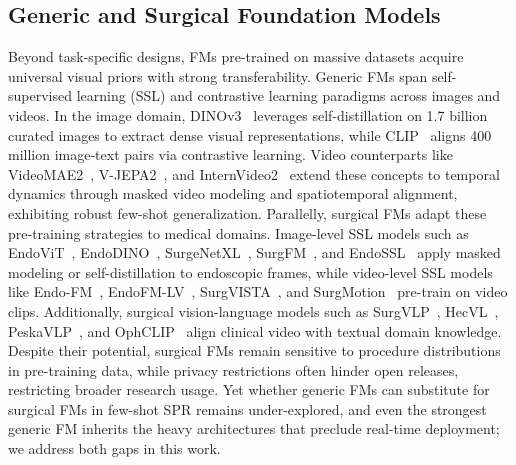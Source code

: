 \subsection{Generic and Surgical Foundation Models}
Beyond task-specific designs, FMs pre-trained on massive datasets acquire universal visual priors with strong transferability. Generic FMs span self-supervised learning (SSL) and contrastive learning paradigms across images and videos. In the image domain, DINOv3~\cite{simeoni2025dinov3} leverages self-distillation on 1.7 billion curated images to extract dense visual representations, while CLIP~\cite{radford2021learning} aligns 400 million image-text pairs via contrastive learning. Video counterparts like VideoMAE2~\cite{wang2023videomae}, V-JEPA2~\cite{assran2025v}, and InternVideo2~\cite{wang2024internvideo2} extend these concepts to temporal dynamics through masked video modeling and spatiotemporal alignment, exhibiting robust few-shot generalization. Parallelly, surgical FMs adapt these pre-training strategies to medical domains. Image-level SSL models such as EndoViT~\cite{batic2024endovit}, EndoDINO~\cite{dermyer2025endodino}, SurgeNetXL~\cite{de2025scaling}, SurgFM~\cite{che2025surg}, and EndoSSL~\cite{hirsch2023self} apply masked modeling or self-distillation to endoscopic frames, while video-level SSL models like Endo-FM~\cite{wang2023foundation}, EndoFM-LV~\cite{wang2025improving}, SurgVISTA~\cite{yang2026large}, and SurgMotion~\cite{wu2026surgmotion} pre-train on video clips. Additionally, surgical vision-language models such as SurgVLP~\cite{yuan2025learning}, HecVL~\cite{yuan2024hecvl}, PeskaVLP~\cite{yuan2024procedure}, and OphCLIP~\cite{hu2024ophclip} align clinical video with textual domain knowledge. Despite their potential, surgical FMs remain sensitive to procedure distributions in pre-training data, while privacy restrictions often hinder open releases, restricting broader research usage. Yet whether generic FMs can substitute for surgical FMs in few-shot SPR remains under-explored, and even the strongest generic FM inherits the heavy architectures that preclude real-time deployment; we address both gaps in this work.


